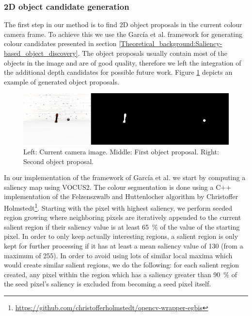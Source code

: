 \documentclass[a4paper,11pt,english]{article}
\begin{document}
\subsubsection{2D object candidate generation}
The first step in our method is to find 2D object proposals in the current colour camera frame.
To achieve this we use the García et al. framework for generating colour candidates presented in section \ref{Theoretical_background:Saliency-based_object_discovery}.
The object proposals usually contain most of the objects in the image and are of good quality, therefore we left the integration of the additional depth candidates for possible future work.
Figure \ref{fig:object_generation} depicts an example of generated object proposals.

\begin{figure}[h!]
	\begin{center}
		\includegraphics[width=1\textwidth]{src/object_generation.png}
		\caption{Left: Current camera image. Middle: First object proposal. Right: Second object proposal.}
		\label{fig:object_generation}
	\end{center}
\end{figure}

In our implementation of the framework of García et al. we start by computing a saliency map using VOCUS2\cite{frintrop2015traditional}.
The colour segmentation is done using a C++ implementation of the Felzenszwalb and Huttenlocher algorithm\cite{felzenszwalb2004efficient} by Christoffer Holmstedt\footnote{\url{https://github.com/christofferholmstedt/opencv-wrapper-egbis}}.
Starting with the pixel with highest saliency, we perform seeded region growing where neighboring pixels are iteratively appended to the current salient region if their saliency value is at least \SI{65}{\percent} of the value of the starting pixel.
In order to only keep actually interesting regions, a salient region is only kept for further processing if it has at least a mean saliency value of \num{130} (from a maximum of \num{255}).
In order to avoid using lots of similar local maxima which would create similar salient regions, we do the following: for each salient region created, any pixel within the region which has a saliency greater than \SI{90}{\percent} of the seed pixel's saliency is excluded from becoming a seed pixel itself.
\end{document}
